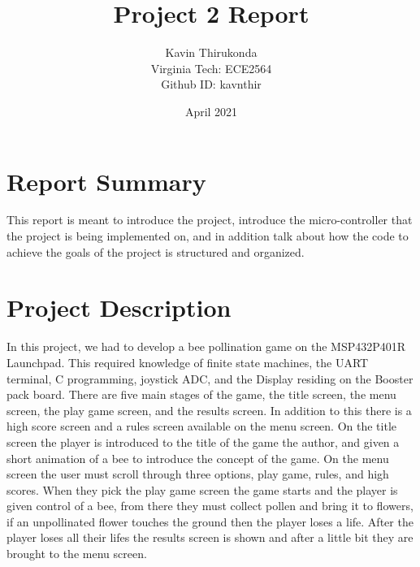 \documentclass{article}
\title{Project 2 Report}
\author{Kavin Thirukonda\\
  Virginia Tech:  ECE2564\\
  Github ID: kavnthir
}
\date{April 2021}
\begin{document}
\maketitle
\newpage
\section{Report Summary}
\indent
This report is meant to introduce the project, introduce the micro-controller that the project is being implemented on, and in addition talk about how the code to achieve the goals of the project is structured and organized.
\section{Project Description}
\indent
In this project, we had to develop a bee pollination game on the MSP432P401R Launchpad. This required knowledge of finite state machines, the UART terminal, C programming, joystick ADC, and the Display residing on the Booster pack board. There are five main stages of the game, the title screen, the menu screen, the play game screen, and the results screen. In addition to this there is a high score screen and a rules screen available on the menu screen. On the title screen the player is introduced to the title of the game the author, and given a short animation of a bee to introduce the concept of the game. On the menu screen the user must scroll through three options, play game, rules, and high scores. When they pick the play game screen the game starts and the player is given control of a bee, from there they must collect pollen and bring it to flowers, if an unpollinated flower touches the ground then the player loses a life. After the player loses all their lifes the results screen is shown and after a little bit they are brought to the menu screen.
\end{document}
